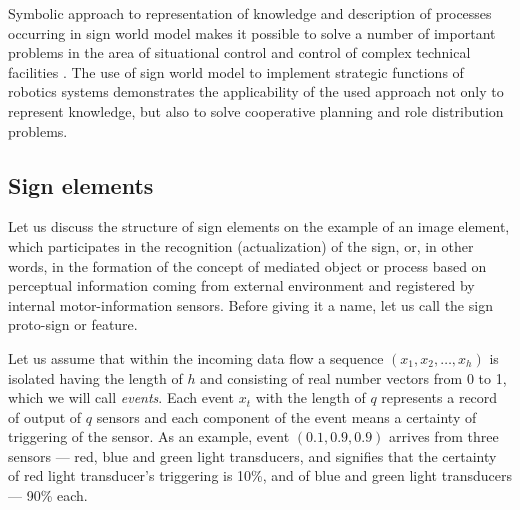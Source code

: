 \documentclass[review]{elsarticle}
\begin{document}
Symbolic approach to representation of knowledge and description of processes occurring in sign world model makes it possible to solve a number of important problems in the area of situational control \cite{Osipov1997a,Osipov1997b} and control of complex technical facilities \cite{Emelyanov2016}. The use of sign world model to implement strategic functions of robotics systems \cite{Emelyanov2016} demonstrates the applicability of the used approach not only to represent knowledge, but also to solve cooperative planning and role distribution problems.


\subsection{Sign elements}\label{subsec:components}

Let us discuss the structure of sign elements on the example of an image element, which participates in the recognition (actualization) of the sign, or, in other words, in the formation of the concept of mediated object or process based on perceptual information coming from external environment and registered by internal motor-information sensors. Before giving it a name, let us call the sign proto-sign or feature.

Let us assume that within the incoming data flow a sequence $(x_1,x_2,\dots,x_h)$ is isolated having the length of $h$ and consisting of real number vectors from 0 to 1, which we will call \textit{events}. Each event $x_t$ with the length of $q$ represents a record of output of $q$ sensors and each component of the event means a certainty of triggering of the sensor. As an example, event $(0.1, 0.9, 0.9)$ arrives from three sensors --- red, blue and green light transducers, and signifies that the certainty of red light transducer's triggering is 10\%, and of blue and green light transducers --- 90\% each.
\end{document}
